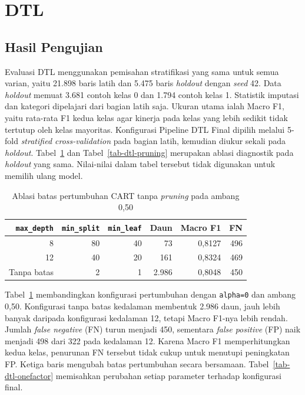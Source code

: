 \section{DTL}
\subsection{Hasil Pengujian}

Evaluasi DTL menggunakan pemisahan stratifikasi yang sama untuk semua varian, yaitu 21.898 baris latih dan 5.475 baris \textit{holdout} dengan \textit{seed} 42. Data \textit{holdout} memuat 3.681 contoh kelas 0 dan 1.794 contoh kelas 1. Statistik imputasi dan kategori dipelajari dari bagian latih saja. Ukuran utama ialah Macro F1, yaitu rata-rata F1 kedua kelas agar kinerja pada kelas yang lebih sedikit tidak tertutup oleh kelas mayoritas. Konfigurasi Pipeline DTL Final dipilih melalui 5-fold \textit{stratified cross-validation} pada bagian latih, kemudian diukur sekali pada \textit{holdout}. Tabel~\ref{tab-dtl-growth} dan Tabel~\ref{tab-dtl-pruning} merupakan ablasi diagnostik pada \textit{holdout} yang sama. Nilai-nilai dalam tabel tersebut tidak digunakan untuk memilih ulang model.

\begin{table}[H]
    \centering
    \caption{Ablasi batas pertumbuhan CART tanpa \textit{pruning} pada ambang 0,50}
    \label{tab-dtl-growth}
    \begin{tabular}{rrrrrr}
        \hline
        \texttt{max\_depth} & \texttt{min\_split} & \texttt{min\_leaf} & Daun  & Macro F1 & FN  \\
        \hline
        8                   & 80                  & 40                 & 73    & 0,8127   & 496 \\
        12                  & 40                  & 20                 & 161   & 0,8324   & 469 \\
        Tanpa batas         & 2                   & 1                  & 2.986 & 0,8048   & 450 \\
        \hline
    \end{tabular}
\end{table}

Tabel~\ref{tab-dtl-growth} membandingkan konfigurasi pertumbuhan dengan \texttt{alpha=0} dan ambang 0,50. Konfigurasi tanpa batas kedalaman membentuk 2.986 daun, jauh lebih banyak daripada konfigurasi kedalaman 12, tetapi Macro F1-nya lebih rendah. Jumlah \textit{false negative} (FN) turun menjadi 450, sementara \textit{false positive} (FP) naik menjadi 498 dari 322 pada kedalaman 12. Karena Macro F1 memperhitungkan kedua kelas, penurunan FN tersebut tidak cukup untuk menutupi peningkatan FP. Ketiga baris mengubah batas pertumbuhan secara bersamaan. Tabel~\ref{tab-dtl-onefactor} memisahkan perubahan setiap parameter terhadap konfigurasi final.

